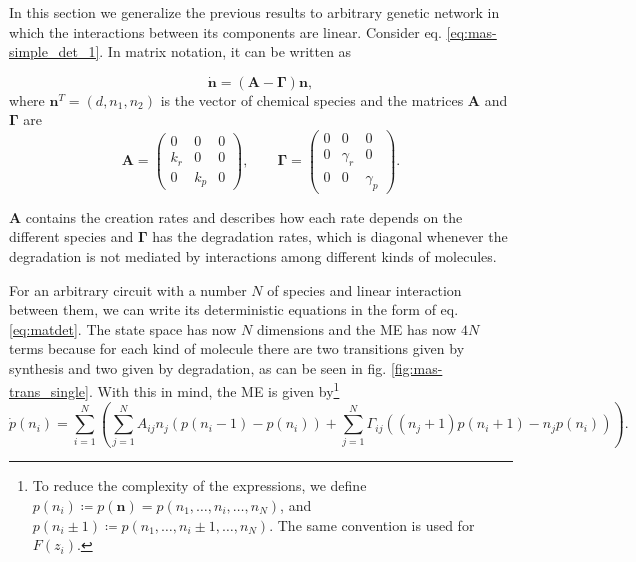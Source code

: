 In this section we generalize the previous results to arbitrary genetic network in which the interactions between its components are linear. Consider eq. \eqref{eq:mas-simple_det_1}. In matrix notation, it can be written as

\begin{equation}
  \label{eq:matdet}
  \mathbf{\dot{n}} = \left( \mathbf{A} - \mathbf{\Gamma} \right) \mathbf{n},
\end{equation}
where $\mathbf{n}^T=(d,n_1,n_2)$ is the vector of chemical species and the matrices $\mathbf{A}$ and $\mathbf{\Gamma}$ are
\begin{equation}
  \label{eq:mas_G_single}
  \mathbf{A} =
  \begin{pmatrix}
    0 & 0 & 0 \\
    k_r & 0 & 0 \\
    0 & k_p & 0
  \end{pmatrix},\quad\quad
  \mathbf{\Gamma} =
  \begin{pmatrix}
    0 & 0 & 0 \\
    0 & \gamma_r & 0 \\
    0 & 0 & \gamma_p 
  \end{pmatrix}. 
\end{equation}

$\mathbf{A}$ contains the creation rates and describes how each rate depends on the different species and $\mathbf{\Gamma}$ has the degradation rates, which is diagonal whenever the degradation is not mediated by interactions among different kinds of molecules.

For an arbitrary circuit with a number $N$ of species and linear interaction between them, we can write its deterministic equations in the form of eq. \eqref{eq:matdet}. The state space has now $N$ dimensions and the ME has now $4N$ terms because for each kind of molecule there are two transitions given by synthesis and two given by degradation, as can be seen in fig. \ref{fig:mas-trans_single}. With this in mind, the ME is given by\footnote{To reduce the complexity of the expressions, we define $p(n_i) \coloneqq p(\mathbf{n}) = p(n_1,\dotsc,n_i,\dotsc,n_N)$, and $p(n_i\pm1)\coloneqq p(n_1,\dotsc,n_i\pm1,\dotsc,n_N)$. The same convention is used for $F(z_i)$.}
\begin{equation}
  \label{eq:masterg1}
  \dot{p}(n_i) =  \sum_{i=1}^N\left(\sum_{j=1}^N A_{ij}n_j \left( p(n_i-1) - p(n_i) \right) + \sum_{j=1}^N \Gamma_{ij}\left((n_j+1)p(n_i+1)-n_jp(n_i)\right)\right).
\end{equation}

